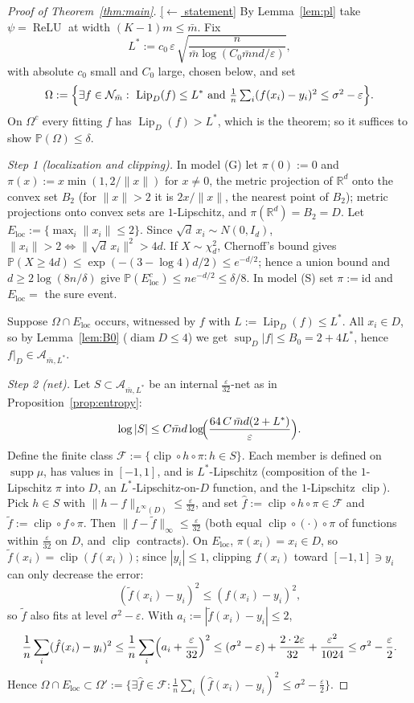 \documentclass[11pt,reqno]{amsart}
\theoremstyle{plain}
\theoremstyle{definition}
\theoremstyle{remark}
\newcommand{\R}{\mathbb{R}}
\newcommand{\PP}{\mathbb{P}}
\newcommand{\eps}{\varepsilon}
\newcommand{\Lip}{\operatorname{Lip}}
\newcommand{\relu}{\operatorname{ReLU}}
\newcommand{\NN}{\mathcal{N}}
\newcommand{\AAA}{\mathcal{A}}
\newcommand{\FF}{\mathcal{F}}
\DeclareMathOperator{\clip}{clip}
\newcommand{\stmtbutton}[1]{\hyperref[#1]{\textnormal{\footnotesize\textsf{[$\leftarrow$ statement]}}}}
\begin{document}
\begin{proof}[Proof of Theorem~\textup{\ref{thm:main}}]\label{proof:main}\stmtbutton{thm:main}
By Lemma~\ref{lem:pl} take $\psi=\relu$ at width $(K-1)m\le\bar m$. Fix
\[
L^\ast:=c_0\,\eps\,\sqrt{\frac{n}{\bar m\log(C_0\bar mnd/\eps)}},
\]
with absolute $c_0$ small and $C_0$ large, chosen below, and set
\[
\Omega:=\Bigl\{\exists f\in\NN_{\bar m}:\ \Lip_D(f)\le L^\ast\ \text{and}\ \tfrac1n\textstyle\sum_i(f(x_i)-y_i)^2\le\sigma^2-\eps\Bigr\}.
\]
On $\Omega^c$ every fitting $f$ has $\Lip_D(f)>L^\ast$, which is the theorem; so it suffices to show $\PP(\Omega)\le\delta$.

\emph{Step 1 (localization and clipping).} In model (G) let $\pi(0):=0$ and $\pi(x):=x\min(1,2/\|x\|)$ for $x\ne0$, the metric projection of $\R^d$ onto the convex set $B_2$ (for $\|x\|>2$ it is $2x/\|x\|$, the nearest point of $B_2$); metric projections onto convex sets are $1$-Lipschitz, and $\pi(\R^d)=B_2=D$. Let $E_{\mathrm{loc}}:=\{\max_i\|x_i\|\le2\}$. Since $\sqrt d\,x_i\sim N(0,I_d)$, $\|x_i\|>2\iff\|\sqrt d\,x_i\|^2>4d$. If $X\sim\chi^2_d$, Chernoff's bound gives $\PP(X\ge4d)\le\exp(-(3-\log4)d/2)\le e^{-d/2}$; hence a union bound and $d\ge2\log(8n/\delta)$ give $\PP(E_{\mathrm{loc}}^c)\le n e^{-d/2}\le\delta/8$. In model (S) set $\pi:=\mathrm{id}$ and $E_{\mathrm{loc}}=$ the sure event.

Suppose $\Omega\cap E_{\mathrm{loc}}$ occurs, witnessed by $f$ with $L:=\Lip_D(f)\le L^\ast$. All $x_i\in D$, so by Lemma~\ref{lem:B0} ($\operatorname{diam}D\le4$) we get $\sup_D|f|\le B_0=2+4L^\ast$, hence $f|_D\in\AAA_{\bar m,L^\ast}$.

\emph{Step 2 (net).} Let $S\subset\AAA_{\bar m,L^\ast}$ be an internal $\tfrac\eps{32}$-net as in Proposition~\ref{prop:entropy}:
\[
\log|S|\le C\bar md\log\!\Bigl(\frac{64\,C\,\bar md(2+L^\ast)}{\eps}\Bigr).
\]
Define the finite class $\FF:=\{\clip\circ h\circ\pi:h\in S\}$. Each member is defined on $\operatorname{supp}\mu$, has values in $[-1,1]$, and is $L^\ast$-Lipschitz (composition of the $1$-Lipschitz $\pi$ into $D$, an $L^\ast$-Lipschitz-on-$D$ function, and the $1$-Lipschitz $\clip$). Pick $h\in S$ with $\|h-f\|_{L^\infty(D)}\le\tfrac\eps{32}$, and set $\hat f:=\clip\circ h\circ\pi\in\FF$ and $\tilde f:=\clip\circ f\circ\pi$. Then $\|\hat f-\tilde f\|_{\infty}\le\tfrac\eps{32}$ (both equal $\clip\circ(\cdot)\circ\pi$ of functions within $\tfrac\eps{32}$ on $D$, and $\clip$ contracts). On $E_{\mathrm{loc}}$, $\pi(x_i)=x_i\in D$, so $\tilde f(x_i)=\clip(f(x_i))$; since $|y_i|\le1$, clipping $f(x_i)$ toward $[-1,1]\ni y_i$ can only decrease the error:
\[
(\tilde f(x_i)-y_i)^2\le(f(x_i)-y_i)^2 ,
\]
so $\tilde f$ also fits at level $\sigma^2-\eps$. With $a_i:=|\tilde f(x_i)-y_i|\le2$,
\[
\frac1n\sum_i(\hat f(x_i)-y_i)^2\le\frac1n\sum_i\Bigl(a_i+\frac\eps{32}\Bigr)^2\le(\sigma^2-\eps)+\frac{2\cdot2\eps}{32}+\frac{\eps^2}{1024}\le\sigma^2-\frac\eps2 .
\]
Hence $\Omega\cap E_{\mathrm{loc}}\subset\Omega':=\{\exists\hat f\in\FF:\tfrac1n\sum_i(\hat f(x_i)-y_i)^2\le\sigma^2-\tfrac\eps2\}$.


\end{proof}
\end{document}

